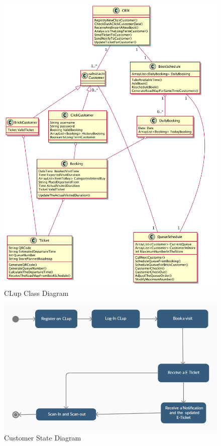\documentclass[a4paper,12pt]{report}
\begin{document}
\begin{figure}[H] 
	\centering
	\includegraphics[scale=0.28]{class_diagram.png}
	\caption{CLup Class Diagram}
	\label{Class Diagram}
\end{figure}

\begin{figure}[H]  
	\centering 
	\includegraphics[scale=0.62]{State_diagram1.png}
	\caption{Customer State Diagram}
	\centering
	\label{State Diagram 1}
\end{figure}
\end{document}

